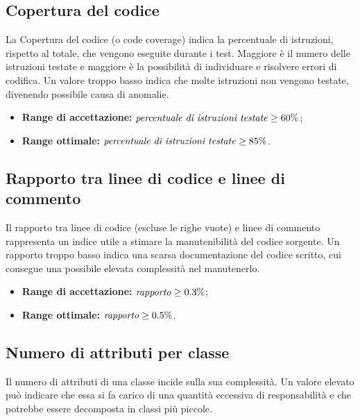 \documentclass[openany,12pt,a4paper]{report}
\begin{document}
\subsection{Copertura del codice}

La Copertura del codice (o code coverage) indica la percentuale di istruzioni,  rispetto al totale, che vengono eseguite durante i test. Maggiore è il numero delle istruzioni testate e maggiore è la possibilità di individuare e risolvere errori di codifica.
Un valore troppo basso indica che molte istruzioni non vengono testate, divenendo possibile causa di anomalie.

\begin{itemize}
    \item \textbf{Range di accettazione:} $ \textrm{\textit{percentuale di istruzioni testate}} \geq 60\% $;
    
    \item \textbf{Range ottimale:} $ \textrm{\textit{percentuale di istruzioni testate}} \geq 85\% $.
\end{itemize}

\subsection{Rapporto tra linee di codice e linee di commento}

Il rapporto tra linee di codice (escluse le righe vuote) e linee di commento rappresenta un indice utile a stimare la manutenibilità del codice sorgente. Un rapporto troppo basso indica una scarsa documentazione del codice scritto, cui consegue una possibile elevata complessità nel manutenerlo.

\begin{itemize}
    \item \textbf{Range di accettazione:} $ \textrm{\textit{rapporto}} \geq 0.3\% $;
    
    \item \textbf{Range ottimale:} $ \textrm{\textit{rapporto}} \geq 0.5\% $.
\end{itemize}

\subsection{Numero di attributi per classe}

Il numero di attributi di una classe incide sulla sua complessità. Un valore elevato può indicare che essa si fa carico di una quantità eccessiva di responsabilità e che potrebbe essere decomposta in classi più piccole.
\end{document}
